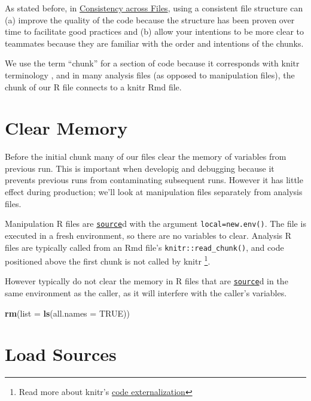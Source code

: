 \documentclass[
]{book}
\newenvironment{Shaded}{\begin{snugshade}}{\end{snugshade}}
\newcommand{\DataTypeTok}[1]{\textcolor[rgb]{0.13,0.29,0.53}{#1}}
\newcommand{\KeywordTok}[1]{\textcolor[rgb]{0.13,0.29,0.53}{\textbf{#1}}}
\newcommand{\NormalTok}[1]{#1}
\newcommand{\OtherTok}[1]{\textcolor[rgb]{0.56,0.35,0.01}{#1}}
\begin{document}
As stated before, in \protect\hyperlink{consistency-files}{Consistency across Files}, using a consistent file structure can (a) improve the quality of the code because the structure has been proven over time to facilitate good practices and (b) allow your intentions to be more clear to teammates because they are familiar with the order and intentions of the chunks.

We use the term ``chunk'' for a section of code because it corresponds with knitr terminology \citep{xie2015}, and in many analysis files (as opposed to manipulation files), the chunk of our R file connects to a knitr Rmd file.

\hypertarget{chunk-clear}{%
\section{Clear Memory}\label{chunk-clear}}

Before the initial chunk many of our files clear the memory of variables from previous run. This is important when developig and debugging because it prevents previous runs from contaminating subsequent runs. However it has little effect during production; we'll look at manipulation files separately from analysis files.

Manipulation R files are \href{https://stat.ethz.ch/R-manual/R-devel/library/base/html/source.html}{\texttt{source}}d with the argument \texttt{local=new.env()}. The file is executed in a fresh environment, so there are no variables to clear. Analysis R files are typically called from an Rmd file's \texttt{knitr::read\_chunk()}, and code positioned above the first chunk is not called by knitr \footnote{Read more about knitr's \href{https://yihui.name/knitr/demo/externalization/}{code externalization}}.

However typically do not clear the memory in R files that are \href{https://stat.ethz.ch/R-manual/R-devel/library/base/html/source.html}{\texttt{source}}d in the same environment as the caller, as it will interfere with the caller's variables.

\begin{Shaded}
\begin{Highlighting}[]
\KeywordTok{rm}\NormalTok{(}\DataTypeTok{list =} \KeywordTok{ls}\NormalTok{(}\DataTypeTok{all.names =} \OtherTok{TRUE}\NormalTok{))}
\end{Highlighting}
\end{Shaded}

\hypertarget{chunk-load-sources}{%
\section{Load Sources}\label{chunk-load-sources}}
\end{document}
